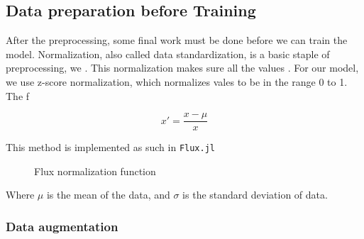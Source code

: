 \subsection{Data preparation before Training} 

After the preprocessing, some final work must be done before we can train the model. Normalization, also called data standardization, 
is a basic staple of preprocessing, we  . This normalization makes sure all the values . For our model, we use z-score normalization, 
which normalizes vales to be in the range 0 to 1. The f

\begin{equation}
    x' = \frac{x - \mu}{x}
\end{equation}

This method is implemented as such in \texttt{Flux.jl}

\begin{figure}[h]
    \centering
    
    \caption{Flux normalization function}
    \label{fig:normalize_data}
\end{figure}

Where $\mu$ is the mean of the data, and $\sigma$ is the standard deviation of data.

\subsubsection{Data augmentation}